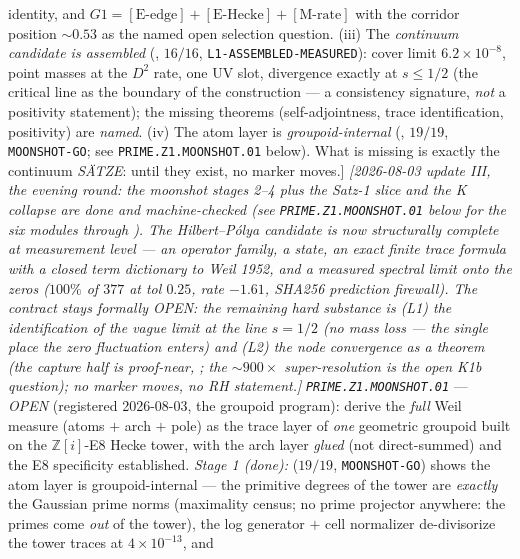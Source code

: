 \documentclass[11pt,a4paper]{article}
\begin{document}
{identity, and $G1=[\mathrm{E\mbox{-}edge}]+[\mathrm{E\mbox{-}Hecke}]
+[\mathrm{M\mbox{-}rate}]$ with the corridor position $\sim0.53$ as
the named open selection question.  (iii) The \emph{continuum
candidate is assembled} (, $16/16$,
\texttt{L1-ASSEMBLED-MEASURED}): cover limit $6.2\times10^{-8}$,
point masses at the $D^2$ rate, one UV slot, divergence exactly at
$s\le1/2$ (the critical line as the boundary of the construction ---
a consistency signature, \emph{not} a positivity statement); the
missing theorems (self-adjointness, trace identification,
positivity) are \emph{named}.  (iv) The atom layer is
\emph{groupoid-internal} (,
$19/19$, \texttt{MOONSHOT-GO}; see
\texttt{PRIME.Z1.MOONSHOT.01} below).  What is missing is exactly
the continuum \emph{S\"ATZE}: until they exist, no marker moves.]}
\emph{[2026-08-03 update III, the evening round: the moonshot
stages 2--4 plus the Satz-1 slice and the K collapse are \emph{done
and machine-checked} (see \texttt{PRIME.Z1.MOONSHOT.01} below for
the six modules  through
).  The Hilbert--P\'olya candidate
is now structurally complete \emph{at measurement level} --- an
operator family, a state, an exact finite trace formula with a
closed term dictionary to Weil 1952, and a measured spectral limit
onto the zeros ($100\%$ of $377$ at tol $0.25$, rate $-1.61$,
SHA256 prediction firewall).  The contract stays \emph{formally
OPEN}: the remaining hard substance is (L1) the identification of
the vague limit \emph{at} the line $s=1/2$ (no mass loss --- the
single place the zero fluctuation enters) and (L2) the node
convergence as a theorem (the capture half is proof-near,
; the ${\sim}900\times$
super-resolution is the open K1b question); no marker moves, no RH
statement.]}
\emph{\texttt{PRIME.Z1.MOONSHOT.01}} --- \emph{OPEN} (registered
2026-08-03, the groupoid program): derive the \emph{full} Weil
measure (atoms $+$ arch $+$ pole) as the trace layer of \emph{one}
geometric groupoid built on the $\mathbb{Z}[i]$-E8 Hecke tower, with
the arch layer \emph{glued} (not direct-summed) and the E8
specificity established.  \emph{Stage 1 (done):}
 ($19/19$,
\texttt{MOONSHOT-GO}) shows the atom layer is groupoid-internal ---
the primitive degrees of the tower are \emph{exactly} the Gaussian
prime norms (maximality census; no prime projector anywhere: the
primes come \emph{out} of the tower), the log generator $+$ cell
normalizer de-divisorize the tower traces at $4\times10^{-13}$, and
\end{document}
